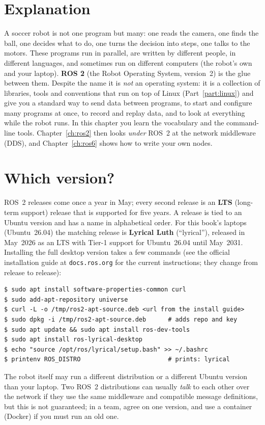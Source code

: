 \label{ch:ros1}

\section*{Explanation}
A soccer robot is not one program but many: one reads the camera, one finds the ball, one decides what to do, one turns the decision into steps, one talks to the motors. These programs run in parallel, are written by different people, in different languages, and sometimes run on different computers (the robot's own and your laptop). \textbf{ROS 2} (the Robot Operating System, version~2) is the glue between them. Despite the name it is \emph{not} an operating system: it is a collection of libraries, tools and conventions that run on top of Linux (Part~\ref{part:linux}) and give you a standard way to send data between programs, to start and configure many programs at once, to record and replay data, and to look at everything while the robot runs. In this chapter you learn the vocabulary and the command-line tools. Chapter~\ref{ch:ros2} then looks \emph{under} ROS~2 at the network middleware (DDS), and Chapter~\ref{ch:ros6} shows how to write your own nodes.

\section*{Which version?}
ROS~2 releases come once a year in May; every second release is an \textbf{LTS} (long-term support) release that is supported for five years. A release is tied to an Ubuntu version and has a name in alphabetical order. For this book's laptops (Ubuntu~26.04) the matching release is \textbf{Lyrical Luth} (``lyrical''), released in May~2026 as an LTS with Tier-1 support for Ubuntu~26.04 until May~2031. Installing the full desktop version takes a few commands (see the official installation guide at \verb!docs.ros.org! for the current instructions; they change from release to release):
\begin{verbatim}
$ sudo apt install software-properties-common curl
$ sudo add-apt-repository universe
$ curl -L -o /tmp/ros2-apt-source.deb <url from the install guide>
$ sudo dpkg -i /tmp/ros2-apt-source.deb      # adds repo and key
$ sudo apt update && sudo apt install ros-dev-tools
$ sudo apt install ros-lyrical-desktop
$ echo "source /opt/ros/lyrical/setup.bash" >> ~/.bashrc
$ printenv ROS_DISTRO                        # prints: lyrical
\end{verbatim}
The robot itself may run a different distribution or a different Ubuntu version than your laptop. Two ROS~2 distributions can usually \emph{talk} to each other over the network if they use the same middleware and compatible message definitions, but this is not guaranteed; in a team, agree on one version, and use a container (Docker) if you must run an old one.

